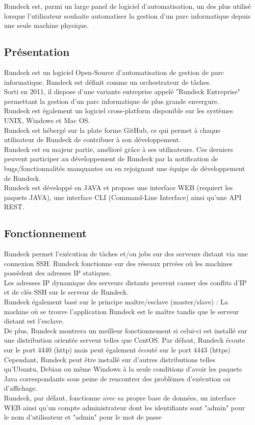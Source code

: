\documentclass[12pt]{article}
\begin{document}
Rundeck est, parmi un large panel de logiciel d'automatisation, un des plus utilisé lorsque l'utilisateur souhaite automatiser la gestion d'un parc informatique depuis une seule machine physique.

\subsection{Présentation}

Rundeck est un logiciel Open-Source d'automatisation de gestion de parc informatique. Rundeck est définit comme un orchestrateur de tâches. 
\\
Sorti en 2011, il dispose d'une variante entreprise appelé "Rundeck Entreprise" permettant la gestion d'un parc informatique de plus grande envergure. 
\\
Rundeck est également un logiciel cross-platform disponible sur les systèmes UNIX, Windows et Mac OS. 
\\
Rundeck est hébergé sur la plate forme GitHub, ce qui permet à chaque utilisateur de Rundeck de contribuer à son développement. 
\\
Rundeck est en majeur partie, amélioré grâce à ses utilisateurs. Ces derniers peuvent participer au développement de Rundeck par la notification de bugs/fonctionnalités manquantes ou en rejoignant une équipe de développement de Rundeck. 
\\
Rundeck est développé en JAVA et propose une interface WEB (requiert les paquets JAVA), une interface CLI (Command-Line Interface) ainsi qu'une API REST.

\subsection{Fonctionnement}

Rundeck permet l'exécution de tâches et/ou jobs sur des serveurs distant via une connexion SSH. Rundeck fonctionne sur des réseaux privées où les machines possèdent des adresses IP statiques. 
\\
Les adresses IP dynamique des serveurs distants peuvent causer des conflits d'IP et de clés SSH sur le serveur de Rundeck.
\\
Rundeck également basé sur le principe maître/esclave (master/slave) : La machine où se trouve l'application Rundeck est le maître tandis que le serveur distant est l'esclave. 
\\
De plus, Rundeck montrera un meilleur fonctionnement si celui-ci est installé sur une distribution orientée serveur telles que CentOS. Par défaut, Rundeck écoute sur le port 4440 (http) mais peut également écouté sur le port 4443 (https)
\\
Cependant, Rundeck peut être installé sur d'autres distributions telles qu'Ubuntu, Debian ou même Windows à la seule conditions d'avoir les paquets Java correspondants sous peine de rencontrer des problèmes d'exécution ou d'affichage.
\\
Rundeck, par défaut, fonctionne avec sa propre base de données, un interface WEB ainsi qu'un compte administrateur dont les identifiants sont "admin" pour le nom d'utilisateur et "admin" pour le mot de passe
\end{document}

